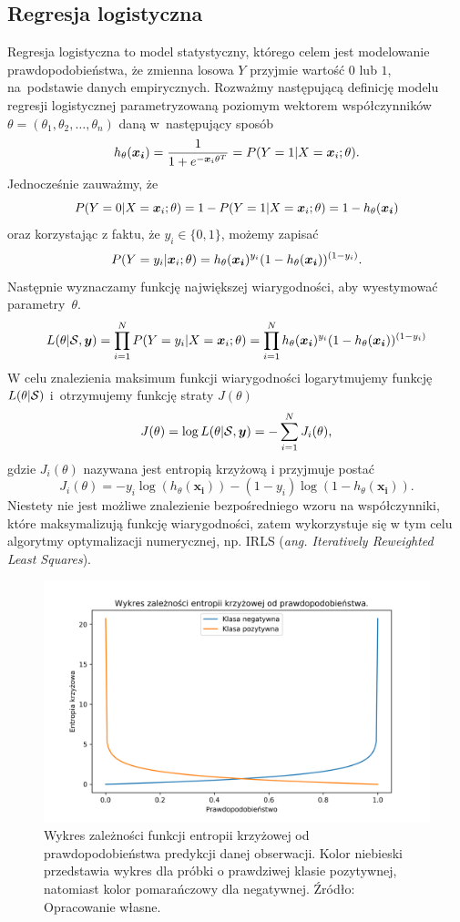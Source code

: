 \documentclass[inzynierska]{pwr_wmat_praca_dyplomowa}
\theoremstyle{plain}
\numberwithin{theorem}{chapter}
\theoremstyle{definition}
\numberwithin{theorem}{chapter}
\begin{document}
\subsection{Regresja logistyczna}
\label{reg-log}
Regresja logistyczna to model statystyczny, którego celem jest modelowanie prawdopodobieństwa, że zmienna losowa $Y$ przyjmie wartość $0$ lub $1$, na~podstawie danych empirycznych. Rozważmy następującą definicję modelu regresji logistycznej parametryzowaną poziomym wektorem współczynników $\theta = (\theta_1, \theta_2, \dots, \theta_n)$ daną w~następujący sposób
\begin{equation}
	h_{\theta}(\boldsymbol{x_i}) = \frac{1}{1+e^{-\boldsymbol{x}_{i}\theta^T}} = P(Y = 1|X = \boldsymbol{x}_{i};\theta) \text{.}
\end{equation} 
Jednocześnie zauważmy, że
$$ P(Y = 0|X = \boldsymbol{x}_{i};\theta) = 1 - P(Y = 1|X = \boldsymbol{x}_{i};\theta) = 1 - h_{\theta}(\boldsymbol{x_i}) $$
oraz korzystając z faktu, że $y_i \in \{0,1\}$, możemy zapisać 
$$ P(Y = y_i|\boldsymbol{x}_{i};\theta) = h_{\theta}(\boldsymbol{x_i})^{y_i}(1-h_{\theta}(\boldsymbol{x_i}))^{(1-y_i)} \text{.}$$
Następnie wyznaczamy funkcję największej wiarygodności, aby wyestymować parametry~$\theta$.
$$ L(\theta | \mathcal{S}, \boldsymbol{y}) = \prod_{i=1}^N P(Y = y_i | X = \boldsymbol{x}_{i}; \theta) = \prod_{i=1}^N h_{\theta}(\boldsymbol{x_i})^{y_i}(1-h_{\theta}(\boldsymbol{x_i}))^{(1-y_i)}$$
W celu znalezienia maksimum funkcji wiarygodności logarytmujemy funkcję $L(\theta | \mathcal{S})$ i~otrzymujemy funkcję straty $J(\theta)$
$$ J(\theta) = \log L(\theta | \mathcal{S}, \boldsymbol{y})  = -\sum_{i=1}^N J_i(\theta)\text{,}$$
gdzie $J_i(\theta)$ nazywana jest entropią krzyżową i przyjmuje postać
\begin{equation}
	\label{c-e}
	J_i(\theta) = -y_i\log(h_{\theta}(\boldsymbol{x_i})) - (1-y_i)\log(1 - h_{\theta}(\boldsymbol{x_i})) \text{.}
\end{equation}
Niestety nie jest możliwe znalezienie bezpośredniego wzoru na współczynniki, które maksymalizują funkcję wiarygodności, zatem wykorzystuje się w tym celu algorytmy optymalizacji numerycznej, np. IRLS (\textit{ang. Iteratively Reweighted Least Squares}).

\begin{figure}[h]
	\includegraphics[width=\linewidth]{images/cross_entropy.png}
	\caption{Wykres zależności funkcji entropii krzyżowej od prawdopodobieństwa predykcji danej obserwacji. Kolor niebieski przedstawia wykres dla próbki o prawdziwej klasie pozytywnej, natomiast kolor pomarańczowy dla negatywnej. Źródło: Opracowanie własne.}
	\label{fig:cross-entropy-plot}
\end{figure}
\end{document}
